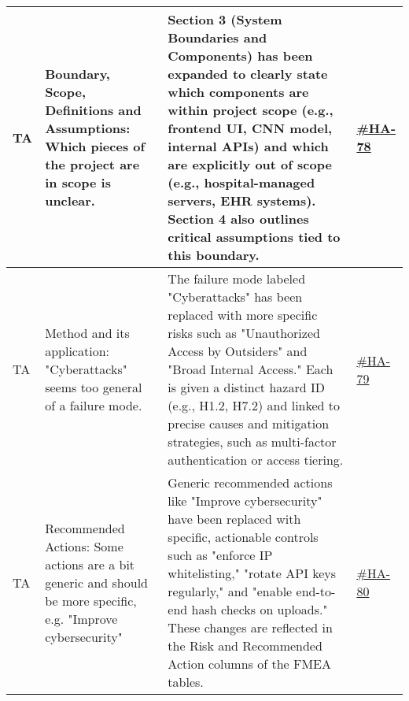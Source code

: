 \documentclass{article}
\begin{document}
\begin{longtable}{|p{1.48cm}|p{5cm}|p{4.7cm}|p{1cm}|}
TA & Boundary, Scope, Definitions and Assumptions: Which pieces of the project are in scope is unclear. & Section 3 (System Boundaries and Components) has been expanded to clearly state which components are within project scope (e.g., frontend UI, CNN model, internal APIs) and which are explicitly out of scope (e.g., hospital-managed servers, EHR systems). Section 4 also outlines critical assumptions tied to this boundary.
&\href{https://github.com/harrisonchiu/xray/issues/78}{\#HA-78}\\
\hline

TA & Method and its application: "Cyberattacks" seems too general of a failure mode. & The failure mode labeled "Cyberattacks" has been replaced with more specific risks such as "Unauthorized Access by Outsiders" and "Broad Internal Access." Each is given a distinct hazard ID (e.g., H1.2, H7.2) and linked to precise causes and mitigation strategies, such as multi-factor authentication or access tiering.
&\href{https://github.com/harrisonchiu/xray/issues/79}{\#HA-79}\\
\hline

TA & Recommended Actions: Some actions are a bit generic and should be more specific, e.g. "Improve cybersecurity" & Generic recommended actions like "Improve cybersecurity" have been replaced with specific, actionable controls such as "enforce IP whitelisting," "rotate API keys regularly," and "enable end-to-end hash checks on uploads." These changes are reflected in the Risk and Recommended Action columns of the FMEA tables.
&\href{https://github.com/harrisonchiu/xray/issues/80}{\#HA-80}\\
\hline

\end{longtable}
\end{document}

